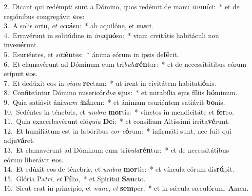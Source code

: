 {2.~}Dicant qui redémpti sunt a Dómino, quos redémit de manu \textit{i}\textit{ni}\textbf{mí}ci:~* et de regiónibus congregávit \textbf{e}os:\\
{3.~}A solis ortu, \textit{et} \textit{oc}\textbf{cá}su:~* ab aquilóne, et \textbf{ma}ri.\\
{4.~}Erravérunt in solitúdine in \textit{i}\textit{na}\textbf{quó}so:~* viam civitátis habitáculi non inve\textbf{né}runt.\\
{5.~}Esuriéntes, et \textit{si}\textit{ti}\textbf{én}tes:~* ánima eórum in ipsis de\textbf{fé}cit.\\
{6.~}Et clamavérunt ad Dóminum cum tri\textit{bu}\textit{la}\textbf{rén}tur:~* et de necessitátibus eórum erípuit \textbf{e}os.\\
{7.~}Et dedúxit eos in \textit{vi}\textit{am} \textbf{re}ctam:~* ut irent in civitátem habitati\textbf{ó}nis.\\
{8.~}Confiteántur Dómino misericór\textit{di}\textit{æ} \textbf{e}jus:~* et mirabília ejus fíliis \textbf{hó}minum.\\
{9.~}Quia satiávit áni\textit{mam} \textit{i}\textbf{ná}nem:~* et ánimam esuriéntem satiávit \textbf{bo}nis.\\
{10.~}Sedéntes in ténebris, et \textit{um}\textit{bra} \textbf{mor}tis:~* vinctos in mendicitáte et \textbf{fer}ro.\\
{11.~}Quia exacerbavérunt eló\textit{qui}\textit{a} \textbf{De}i:~* et consílium Altíssimi irrita\textbf{vé}runt.\\
{12.~}Et humiliátum est in labóribus \textit{cor} \textit{e}\textbf{ó}rum:~* infirmáti sunt, nec fuit qui adju\textbf{vá}ret.\\
{13.~}Et clamavérunt ad Dóminum cum tri\textit{bu}\textit{la}\textbf{rén}tur:~* et de necessitátibus eórum liberávit \textbf{e}os.\\
{14.~}Et edúxit eos de ténebris, et \textit{um}\textit{bra} \textbf{mor}tis:~* et víncula eórum dis\textbf{rú}pit.\\
{15.~}Glória Pa\textit{tri}, \textit{et} \textbf{Fí}lio,~* et Spirítui \textbf{San}cto.\\
{16.~}Sicut erat in princípio, et \textit{nunc}, \textit{et} \textbf{sem}per,~* et in sǽcula sæculórum. \textbf{A}men.\\

